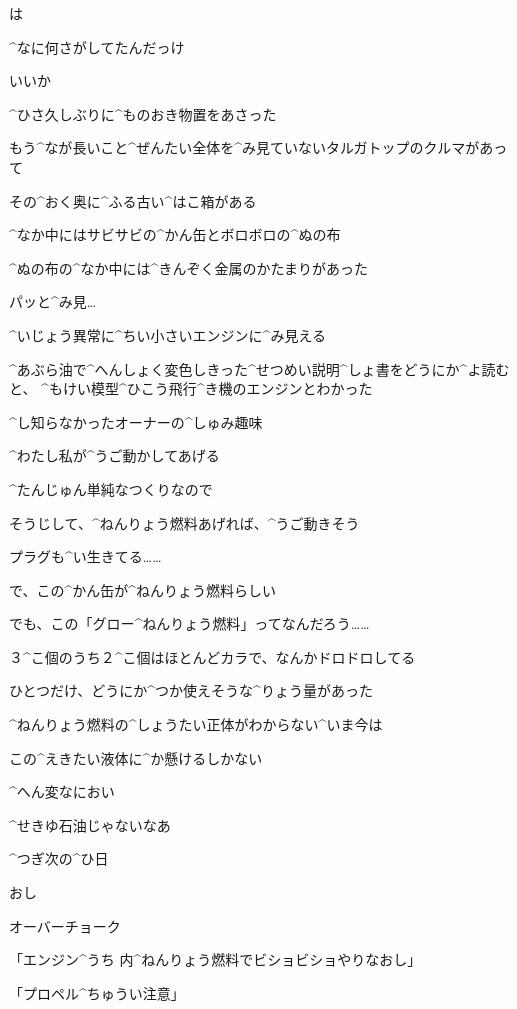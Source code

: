 \A は

\A ^{なに}{何}さがしてたんだっけ

\page
\A いいか

\A ^{ひさ}{久}しぶりに^{ものおき}{物置}をあさった

\A もう^{なが}{長}いこと^{ぜんたい}{全体}を^{み}{見}ていないタルガトップのクルマがあって

\A その^{おく}{奥}に^{ふる}{古}い^{はこ}{箱}がある

\page
\A ^{なか}{中}にはサビサビの^{かん}{缶}とボロボロの^{ぬの}{布}

\A ^{ぬの}{布}の^{なか}{中}には^{きんぞく}{金属}のかたまりがあった

\A パッと^{み}{見}…

\A ^{いじょう}{異常}に^{ちい}{小}さいエンジンに^{み}{見}える

\page
\A ^{あぶら}{油}で^{へんしょく}{変色}しきった^{せつめい}{説明}^{しょ}{書}をどうにか^{よ}{読}むと、
^{もけい}{模型}^{ひこう}{飛行}^{き}{機}のエンジンとわかった

\A ^{し}{知}らなかったオーナーの^{しゅみ}{趣味}

\A ^{わたし}{私}が^{うご}{動}かしてあげる

\page
\A ^{たんじゅん}{単純}なつくりなので

\A そうじして、^{ねんりょう}{燃料}あげれば、^{うご}{動}きそう

\A プラグも^{い}{生}きてる……

\A で、この^{かん}{缶}が^{ねんりょう}{燃料}らしい

\A でも、この「グロー^{ねんりょう}{燃料}」ってなんだろう……

\A ３^{こ}{個}のうち２^{こ}{個}はほとんどカラで、なんかドロドロしてる

\A ひとつだけ、どうにか^{つか}{使}えそうな^{りょう}{量}があった

\A ^{ねんりょう}{燃料}の^{しょうたい}{正体}がわからない^{いま}{今}は

\A この^{えきたい}{液体}に^{か}{懸}けるしかない

\A ^{へん}{変}なにおい

\A ^{せきゆ}{石油}じゃないなあ

\page
\A ^{つぎ}{次}の^{ひ}{日}

\A おし

\A オーバーチョーク

\A 「エンジン^{うち }{内}^{ねんりょう}{燃料}でビショビショやりなおし」

\A 「プロペル^{ちゅうい}{注意}」

